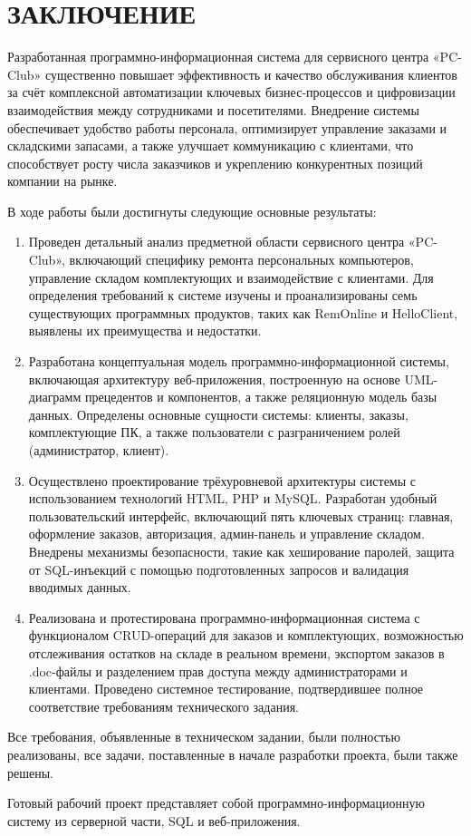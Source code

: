 \section*{ЗАКЛЮЧЕНИЕ}

Разработанная программно-информационная система для сервисного центра «PC-Club» существенно повышает эффективность и качество обслуживания клиентов за счёт комплексной автоматизации ключевых бизнес-процессов и цифровизации взаимодействия между сотрудниками и посетителями. Внедрение системы обеспечивает удобство работы персонала, оптимизирует управление заказами и складскими запасами, а также улучшает коммуникацию с клиентами, что способствует росту числа заказчиков и укреплению конкурентных позиций компании на рынке.

В ходе работы были достигнуты следующие основные результаты:

\begin{enumerate}
	\item Проведен детальный анализ предметной области сервисного центра «PC-Club», включающий специфику ремонта персональных компьютеров, управление складом комплектующих и взаимодействие с клиентами. Для определения требований к системе изучены и проанализированы семь существующих программных продуктов, таких как RemOnline и HelloClient, выявлены их преимущества и недостатки.
	
	\item Разработана концептуальная модель программно-информационной системы, включающая архитектуру веб-приложения, построенную на основе UML-диаграмм прецедентов и компонентов, а также реляционную модель базы данных. Определены основные сущности системы: клиенты, заказы, комплектующие ПК, а также пользователи с разграничением ролей (администратор, клиент).
	
	\item Осуществлено проектирование трёхуровневой архитектуры системы с использованием технологий HTML, PHP и MySQL. Разработан удобный пользовательский интерфейс, включающий пять ключевых страниц: главная, оформление заказов, авторизация, админ-панель и управление складом. Внедрены механизмы безопасности, такие как хеширование паролей, защита от SQL-инъекций с помощью подготовленных запросов и валидация вводимых данных.
	
	\item Реализована и протестирована программно-информационная система с функционалом CRUD-операций для заказов и комплектующих, возможностью отслеживания остатков на складе в реальном времени, экспортом заказов в .doc-файлы и разделением прав доступа между администраторами и клиентами. Проведено системное тестирование, подтвердившее полное соответствие требованиям технического задания.
	
\end{enumerate}

Все требования, объявленные в техническом задании, были полностью реализованы, все задачи, поставленные в начале разработки проекта, были также решены.

Готовый рабочий проект представляет собой программно-информационную систему из серверной части, SQL и веб-приложения.